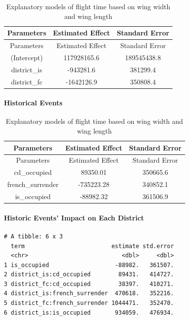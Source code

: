 \documentclass[
  letterpaper,
  DIV=11,
  numbers=noendperiod]{scrartcl}
\let\oldparagraph\paragraph
\renewcommand{\paragraph}[1]{\oldparagraph{#1}\mbox{}}
\begin{document}
\hypertarget{tbl-district}{}
\begin{longtable}[]{@{}ccc@{}}
\caption{\label{tbl-district}Explanatory models of flight time based on
wing width and wing length}\tabularnewline
\toprule\noalign{}
Parameters & Estimated Effect & Standard Error \\
\midrule\noalign{}
\endfirsthead
\toprule\noalign{}
Parameters & Estimated Effect & Standard Error \\
\midrule\noalign{}
\endhead
\bottomrule\noalign{}
\endlastfoot
(Intercept) & 117928165.6 & 189545438.8 \\
district\_is & -943281.6 & 381299.4 \\
district\_fc & -1642126.9 & 350808.4 \\
\end{longtable}

\hypertarget{historical-events}{%
\paragraph{Historical Events}\label{historical-events}}

\hypertarget{tbl-events}{}
\begin{longtable}[]{@{}ccc@{}}
\caption{\label{tbl-events}Explanatory models of flight time based on
wing width and wing length}\tabularnewline
\toprule\noalign{}
Parameters & Estimated Effect & Standard Error \\
\midrule\noalign{}
\endfirsthead
\toprule\noalign{}
Parameters & Estimated Effect & Standard Error \\
\midrule\noalign{}
\endhead
\bottomrule\noalign{}
\endlastfoot
cd\_occupied & 89350.01 & 350665.6 \\
french\_surrender & -735223.28 & 340852.1 \\
is\_occupied & -88982.32 & 361506.9 \\
\end{longtable}

\hypertarget{historic-events-impact-on-each-district}{%
\paragraph{Historic Events' Impact on Each
District}\label{historic-events-impact-on-each-district}}

\begin{verbatim}
# A tibble: 6 x 3
  term                         estimate std.error
  <chr>                           <dbl>     <dbl>
1 is_occupied                   -88982.   361507.
2 district_is:cd_occupied        89431.   414727.
3 district_fc:cd_occupied        38397.   410271.
4 district_is:french_surrender  470618.   352216.
5 district_fc:french_surrender 1044471.   352470.
6 district_is:is_occupied       934059.   476934.
\end{verbatim}
\end{document}
